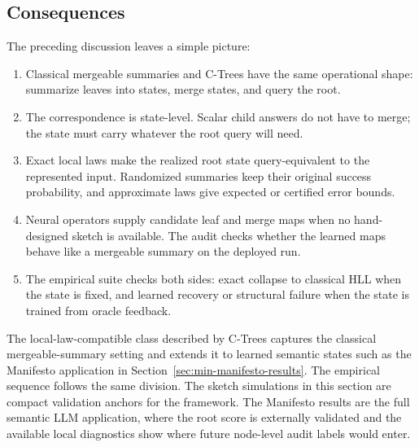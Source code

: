 \subsection{Consequences}
\label{sec:v7-what-established}

The preceding discussion leaves a simple picture:
\begin{enumerate}[leftmargin=1.5em]
\item Classical mergeable summaries and C-Trees have the same operational
shape: summarize leaves into states, merge states, and query the root.
\item The correspondence is state-level. Scalar child answers do not have
to merge; the state must carry whatever the root query will need.
\item Exact local laws make the realized root state query-equivalent to
the represented input. Randomized summaries keep their original success
probability, and approximate laws give expected or certified error bounds.
\item Neural operators supply candidate leaf and merge maps when no
hand-designed sketch is available. The audit checks whether the learned
maps behave like a mergeable summary on the deployed run.
\item The empirical suite checks both sides: exact collapse to classical
HLL when the state is fixed, and learned recovery or structural failure
when the state is trained from oracle feedback.
\end{enumerate}

The local-law-compatible class described by C-Trees captures the
classical mergeable-summary setting and extends it to learned semantic
states such as the Manifesto application in
Section~\ref{sec:min-manifesto-results}. The empirical sequence follows
the same division. The sketch simulations in this section are compact
validation anchors for the framework. The Manifesto results are the
full semantic LLM application, where the root score is externally
validated and the available local diagnostics show where future
node-level audit labels would enter.
